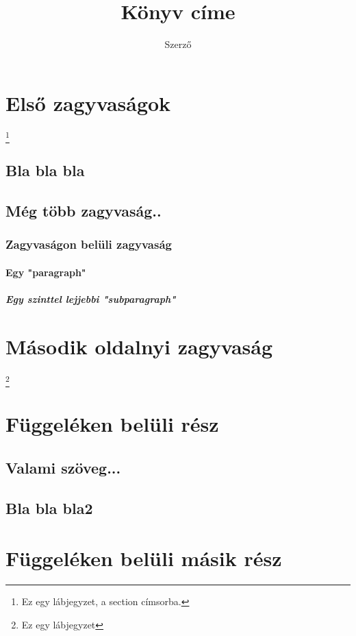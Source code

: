 \documentclass[twocolumn]{book}
\begin{document}
\title{Könyv címe}
\author{Szerző}
\maketitle

\tableofcontents
\newpage

\section[zagyvaság]{Első zagyvaságok}
\footnote{Ez egy lábjegyzet, a section címsorba.}
\subsection{Bla bla bla}
\hulipsum[2]
\subsection{Még több zagyvaság..}
\hulipsum[2]
\subsubsection{Zagyvaságon belüli zagyvaság}
\paragraph{Egy "paragraph"}
\subparagraph{Egy szinttel lejjebbi "subparagraph"}
\newpage
\section{Második oldalnyi zagyvaság}
\hulipsum[2-3] \linebreak
\footnote{Ez egy lábjegyzet}

\appendix
\section{Függeléken belüli rész}
\subsection{Valami szöveg...}
\subsection{Bla bla bla2}

\section{Függeléken belüli másik rész}
\end{document}
